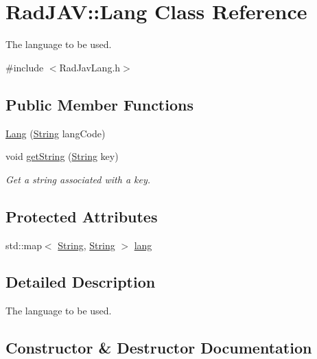 \hypertarget{class_rad_j_a_v_1_1_lang}{}\section{Rad\+J\+AV\+:\+:Lang Class Reference}
\label{class_rad_j_a_v_1_1_lang}


The language to be used.  




{\ttfamily \#include $<$Rad\+Jav\+Lang.\+h$>$}

\subsection*{Public Member Functions}
\begin{DoxyCompactItemize}
\item 
\hyperlink{class_rad_j_a_v_1_1_lang_a6ed1ecee6842cf5d4ffa0a5afcc8dbbc}{Lang} (\hyperlink{class_rad_j_a_v_1_1_string}{String} lang\+Code)
\item 
void \hyperlink{class_rad_j_a_v_1_1_lang_a38ebc57271ef3ffc4ed6aec7854360bf}{get\+String} (\hyperlink{class_rad_j_a_v_1_1_string}{String} key)
\begin{DoxyCompactList}\small\item\em Get a string associated with a key. \end{DoxyCompactList}\end{DoxyCompactItemize}
\subsection*{Protected Attributes}
\begin{DoxyCompactItemize}
\item 
std\+::map$<$ \hyperlink{class_rad_j_a_v_1_1_string}{String}, \hyperlink{class_rad_j_a_v_1_1_string}{String} $>$ \hyperlink{class_rad_j_a_v_1_1_lang_ae8341308089ef735fd294bbdd91c2f37}{lang}
\end{DoxyCompactItemize}


\subsection{Detailed Description}
The language to be used. 

\subsection{Constructor \& Destructor Documentation}
